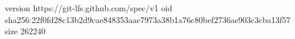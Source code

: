 version https://git-lfs.github.com/spec/v1
oid sha256:22f0fd28c13b2d9cae848353aae7973a38b1a76c80bef2736ae903c3cba13f57
size 262240
